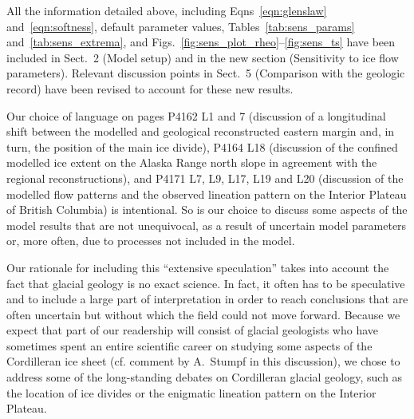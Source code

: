 \clearpage  %

All the information detailed above, including
Eqns~\ref{eqn:glenslaw} and~\ref{eqn:softness}, default parameter values,
Tables~\ref{tab:sens_params} and~\ref{tab:sens_extrema}, and
Figs.~\ref{fig:sens_plot_rheo}--\ref{fig:sens_ts} have been included in Sect.~2
(Model setup) and in the new section (Sensitivity to ice flow parameters).
Relevant discussion points in Sect.~5 (Comparison with the geologic record)
have been revised to account for these new results.


Our choice of language on pages P4162 L1 and 7 (discussion of a longitudinal shift
between the modelled and geological reconstructed eastern margin and, in turn,
the position of the main ice divide), P4164 L18 (discussion of the confined
modelled ice extent on the Alaska Range north slope in agreement with the
regional reconstructions), and P4171
L7, L9, L17, L19 and L20 (discussion of the modelled flow patterns and the
observed lineation pattern on the Interior Plateau of British Columbia) is
intentional. So is our choice to discuss some aspects of the model results that
are not unequivocal, as a result of uncertain model parameters or, more often,
due to processes not included in the model.

Our rationale for including this ``extensive speculation'' takes into account
the fact that glacial geology is no exact science. In fact, it often has to be
speculative and to include a large part of interpretation in order to reach
conclusions that are often uncertain but without which the field could not move
forward. Because we expect that part of our readership will consist of glacial
geologists who have sometimes spent an entire scientific career on studying
some aspects of the Cordilleran ice sheet (cf. comment by A.~Stumpf in this
discussion), we chose to address some of the long-standing debates on
Cordilleran glacial geology, such as the location of ice divides or
the enigmatic lineation pattern on the Interior Plateau.

